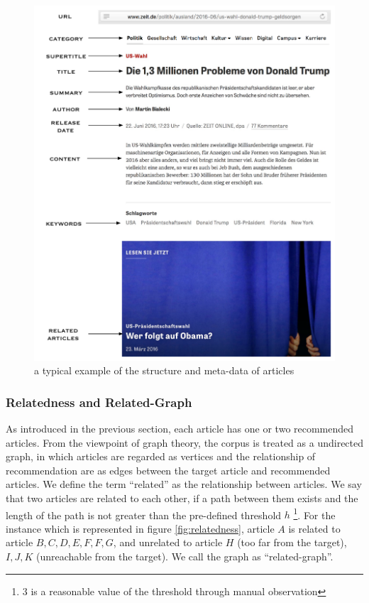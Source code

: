     \begin{figure}[!htb]
    \centering
    \includegraphics[width=1\textwidth]{fig/article.pdf}
    \caption{a typical example of the structure and meta-data of articles}
    \label{fig:article_structure}
    \end{figure}

\subsubsection{Relatedness and Related-Graph}

As introduced in the previous section, each article has one or two recommended articles. From the viewpoint of graph theory, the corpus is treated as a undirected graph, in which articles are regarded as vertices and the relationship of recommendation are as edges between the target article and recommended articles. We define the term ``related'' as the relationship between articles. We say that two articles are related to each other, if a path between them exists and the length of the path is not greater than the pre-defined threshold $h$ \footnote{$3$ is a reasonable value of the threshold through manual observation}. For the instance which is represented in figure \ref{fig:relatedness}, article $A$ is related to article $B, C, D, E, F, F, G$, and unrelated to article $H$ (too far from the target), $I, J, K$ (unreachable from the target). We call the graph as ``related-graph''.
 
